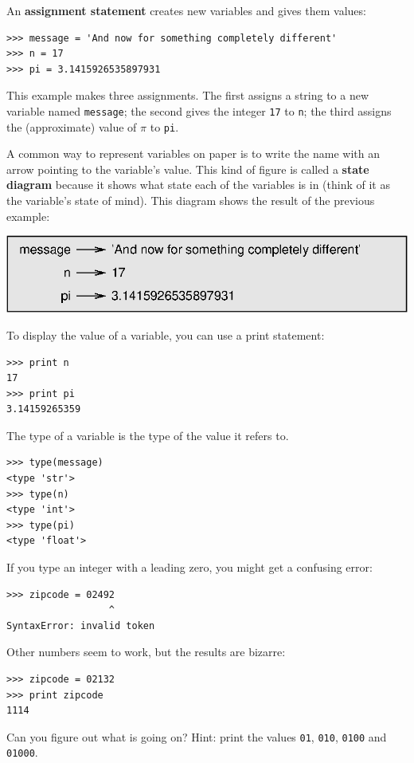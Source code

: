 \documentclass[10pt]{book}
\begin{document}
An {\bf assignment statement} creates new variables and gives
them values:

\beforeverb
\begin{verbatim}
>>> message = 'And now for something completely different'
>>> n = 17
>>> pi = 3.1415926535897931
\end{verbatim}
\afterverb
%
This example makes three assignments.  The first assigns a string
to a new variable named {\tt message};
the second gives the integer {\tt 17} to {\tt n}; the third
assigns the (approximate) value of $\pi$ to {\tt pi}.


A common way to represent variables on paper is to write the name with
an arrow pointing to the variable's value.  This kind of figure is
called a {\bf state diagram} because it shows what state each of the
variables is in (think of it as the variable's state of mind).
This diagram shows the result of the previous example:

\beforefig
\centerline{\includegraphics{figs/state2.eps}}
\afterfig

To display the value of a variable, you can use a print statement:

\beforeverb
\begin{verbatim}
>>> print n
17
>>> print pi
3.14159265359
\end{verbatim}
\afterverb
%
The type of a variable is the type of the value it refers to.

\beforeverb
\begin{verbatim}
>>> type(message)
<type 'str'>
>>> type(n)
<type 'int'>
>>> type(pi)
<type 'float'>
\end{verbatim}
\afterverb
%
\begin{ex}
If you type an integer with a leading zero, you might get
a confusing error:

\beforeverb
\begin{verbatim}
>>> zipcode = 02492
                  ^
SyntaxError: invalid token
\end{verbatim}
\afterverb

Other numbers seem to work, but the results are bizarre:

\beforeverb
\begin{verbatim}
>>> zipcode = 02132
>>> print zipcode
1114
\end{verbatim}
\afterverb

Can you figure out what is going on?  Hint: print the
values {\tt 01}, {\tt 010}, {\tt 0100} and {\tt 01000}.


\end{ex}
\end{document}
